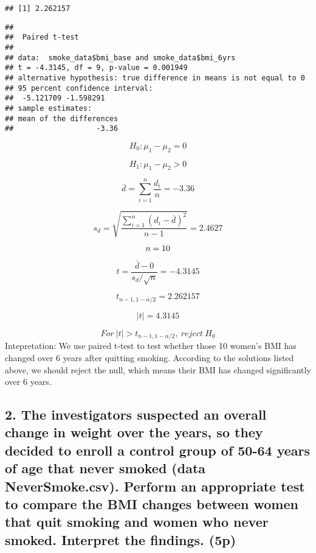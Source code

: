 \documentclass[]{article}
\newenvironment{Shaded}{\begin{snugshade}}{\end{snugshade}}
\newcommand{\KeywordTok}[1]{\textcolor[rgb]{0.13,0.29,0.53}{\textbf{#1}}}
\newcommand{\DataTypeTok}[1]{\textcolor[rgb]{0.13,0.29,0.53}{#1}}
\newcommand{\OtherTok}[1]{\textcolor[rgb]{0.56,0.35,0.01}{#1}}
\newcommand{\OperatorTok}[1]{\textcolor[rgb]{0.81,0.36,0.00}{\textbf{#1}}}
\newcommand{\NormalTok}[1]{#1}
\begin{document}
\begin{verbatim}
## [1] 2.262157
\end{verbatim}

\begin{Shaded}
\end{Shaded}

\begin{verbatim}
## 
##  Paired t-test
## 
## data:  smoke_data$bmi_base and smoke_data$bmi_6yrs
## t = -4.3145, df = 9, p-value = 0.001949
## alternative hypothesis: true difference in means is not equal to 0
## 95 percent confidence interval:
##  -5.121709 -1.598291
## sample estimates:
## mean of the differences 
##                   -3.36
\end{verbatim}

\[
H_{0} : \mu_{1} - \mu_{2} = 0
\]

\[
H_{1} : \mu_{1} - \mu_{2} > 0
\]

\[
\bar{d}= \sum_{i=1}^{n}\frac{d_{i}}{n}=-3.36
\]

\[
s_{d}=\sqrt{\frac{\sum_{i=1}^{n}(d_{i}-\bar{d})^{2}}{n-1}}=2.4627
\]

\[
n = 10\\
\]

\[
t=\frac{\bar{d}-0}{s_{d}/\sqrt{n}}=-4.3145
\]

\[
t_{n-1, 1-\alpha /2}=2.262157
\]

\[
\left | t \right |=4.3145
\]

\[
For\ \left | t \right |> t_{n-1, 1-\alpha /2},\ reject\ H_{0}
\] Intepretation: We use paired t-test to test whether those 10 women's
BMI has changed over 6 years after quitting smoking. According to the
solutions listed above, we should reject the null, which means their BMI
has changed significantly over 6 years.

\subsection{2. The investigators suspected an overall change in weight
over the years, so they decided to enroll a control group of 50-64 years
of age that never smoked (data NeverSmoke.csv). Perform an appropriate
test to compare the BMI changes between women that quit smoking and
women who never smoked. Interpret the findings.
(5p)}\label{the-investigators-suspected-an-overall-change-in-weight-over-the-years-so-they-decided-to-enroll-a-control-group-of-50-64-years-of-age-that-never-smoked-data-neversmoke.csv.-perform-an-appropriate-test-to-compare-the-bmi-changes-between-women-that-quit-smoking-and-women-who-never-smoked.-interpret-the-findings.-5p}
\end{document}
